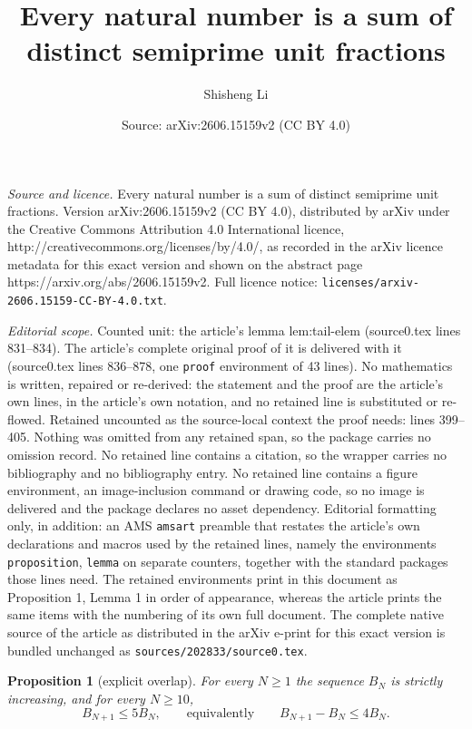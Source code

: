 \documentclass[10pt,a4paper]{amsart}
\title{Every natural number is a sum of distinct semiprime unit fractions}
\author{Shisheng Li}
\date{Source: arXiv:2606.15159v2 (CC BY 4.0)}
\newtheorem{proposition}{Proposition}
\begin{document}
\maketitle

\noindent\emph{Source and licence.} Every natural number is a sum of distinct semiprime unit fractions. Version arXiv:2606.15159v2 (CC BY 4.0), distributed by arXiv under the Creative Commons Attribution 4.0 International licence, http://creativecommons.org/licenses/by/4.0/, as recorded in the arXiv licence metadata for this exact version and shown on the abstract page https://arxiv.org/abs/2606.15159v2. Full licence notice: \texttt{licenses/arxiv-2606.15159-CC-BY-4.0.txt}.\par\smallskip

\noindent\textit{Editorial scope.} Counted unit: the article's lemma lem:tail-elem (source0.tex lines 831--834). The article's complete original proof of it is delivered with it (source0.tex lines 836--878, one \texttt{proof} environment of 43 lines). No mathematics is written, repaired or re-derived: the statement and the proof are the article's own lines, in the article's own notation, and no retained line is substituted or re-flowed.  Retained uncounted as the source-local context the proof needs: lines 399--405.  Nothing was omitted from any retained span, so the package carries no omission record.  No retained line contains a citation, so the wrapper carries no bibliography and no bibliography entry.  No retained line contains a figure environment, an image-inclusion command or drawing code, so no image is delivered and the package declares no asset dependency.  Editorial formatting only, in addition: an AMS \texttt{amsart} preamble that restates the article's own declarations and macros used by the retained lines, namely the environments \texttt{proposition}, \texttt{lemma} on separate counters, together with the standard packages those lines need.  The retained environments print in this document as Proposition 1, Lemma 1 in order of appearance, whereas the article prints the same items with the numbering of its own full document.  The complete native source of the article as distributed in the arXiv e-print for this exact version is bundled unchanged as \texttt{sources/202833/source0.tex}.
\begin{proposition}[explicit overlap]\label{prop:overlap}
For every $N\ge 1$ the sequence $B_N$ is strictly increasing, and for every
$N\ge 10$,
\[
B_{N+1}\le 5B_N,\qquad\text{equivalently}\qquad B_{N+1}-B_N\le 4B_N .
\]
\end{proposition}
\end{document}
